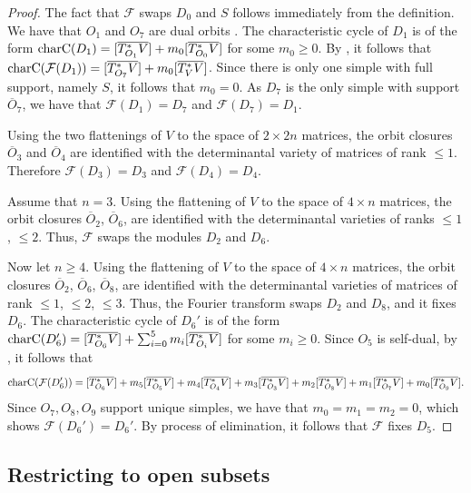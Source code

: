 \documentclass[11pt,reqno]{amsart}
\newcommand{\tn}{\textnormal}
\newcommand{\mc}[1]{\mathcal{#1}}
\numberwithin{equation}{section}
\begin{document}
\begin{proof} The fact that $\mc{F}$ swaps $D_0$ and $S$ follows immediately from the definition.
We have that $O_1$ and $O_7$ are dual orbits \cite[Table 10.3.1]{landsberg2012tensors}. The characteristic cycle of $D_1$ is of the form $\tn{charC}(D_1)=[\overline{T^{\ast}_{O_1}V}]+m_0[\overline{T^{\ast}_{O_0}V}]$ for some $m_0\geq 0$. By \cite[Equation 4.15]{lHorincz2019categories}, it follows that $\tn{charC}(\mc{F}(D_1))=[\overline{T^{\ast}_{O_7}V}]+m_0[\overline{T^{\ast}_{V}V}]$. Since there is only one simple with full support, namely $S$, it follows that $m_0=0$. As $D_7$ is the only simple with support $\overline{O}_7$, we have that $\mc{F}(D_1)=D_7$ and $\mc{F}(D_7)=D_1$.

Using the two flattenings of $V$ to the space of $2\times 2n$ matrices, the orbit closures $\overline{O}_3$ and $\overline{O}_4$ are identified with the determinantal variety of matrices of rank $\leq 1$. Therefore $\mc{F}(D_3)=D_3$ and $\mc{F}(D_4)=D_4$. 

Assume that $n=3$. Using the flattening of $V$ to the space of $4\times n$ matrices, the orbit closures $\overline{O}_2$, $\overline{O}_6$, are identified with the determinantal varieties of ranks $\leq 1$, $\leq 2$. Thus, $\mc{F}$ swaps the modules $D_2$ and $D_6$.

Now let $n\geq 4$. Using the flattening of $V$ to the space of $4\times n$ matrices, the orbit closures $\overline{O}_2$, $\overline{O}_6$, $\overline{O}_8$, are identified with the determinantal varieties of matrices of rank $\leq 1$, $\leq 2$, $\leq 3$. Thus, the Fourier transform swaps $D_2$ and $D_8$, and it fixes $D_6$. The characteristic cycle of $D_6'$ is of the form $\tn{charC}(D_6')=[\overline{T^{\ast}_{O_6}V}]+\sum_{i=0}^5 m_i[\overline{T^{\ast}_{O_i}V}]$ for some $m_i\geq 0$. Since $O_5$ is self-dual, by \cite[Equation 4.15]{lHorincz2019categories}, it follows that
$$
\tn{charC}(\mc{F}(D_6'))=[\overline{T^{\ast}_{O_6}V}]+m_5[\overline{T^{\ast}_{O_5}V}]+m_4[\overline{T^{\ast}_{O_4}V}]+m_3[\overline{T^{\ast}_{O_3}V}]+m_2[\overline{T^{\ast}_{O_8}V}]+m_1[\overline{T^{\ast}_{O_7}V}]+m_0[\overline{T^{\ast}_{O_9}V}].
$$
Since $O_7, O_8, O_9$ support unique simples, we have that $m_0=m_1=m_2=0$, which shows $\mc{F}(D_6')=D_6'$. By process of elimination, it follows that $\mc{F}$ fixes $D_5$.
\end{proof}



\subsection{Restricting to open subsets}\label{sec:open}
\end{document}
